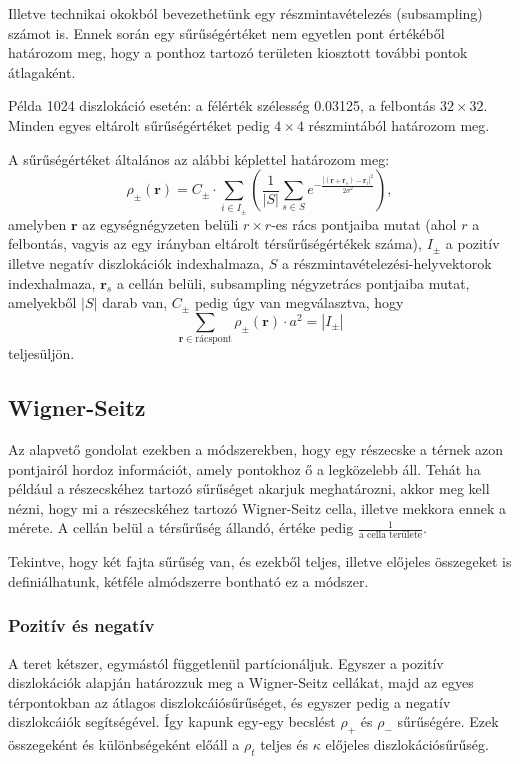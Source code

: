 \documentclass[10pt,a4paper]{scrartcl}
\let\mathbf\bm
\begin{document}
Illetve technikai okokból bevezethetünk egy részmintavételezés (subsampling) számot is. Ennek során egy sűrűségértéket nem egyetlen pont értékéből határozom meg, hogy a ponthoz tartozó területen kiosztott további pontok átlagaként.

Példa 1024 diszlokáció esetén: a félérték szélesség 0.03125, a felbontás $32\times 32$. Minden egyes eltárolt sűrűségértéket pedig $4\times 4$ részmintából határozom meg.

A sűrűségértéket általános az alábbi képlettel határozom meg:
\[{\rho _ \pm }\left( {\mathbf{r}} \right) = {C_ \pm } \cdot \sum\limits_{i \in {I_ \pm }} {\left( {\frac{1}{{\left| S \right|}}\sum\limits_{s \in S} {{e^{ - \frac{{{{\left| {\left( {{\mathbf{r}} + {{\mathbf{r}}_s}} \right) - {{\mathbf{r}}_i}} \right|}^2}}}{{2{\sigma ^2}}}}}} } \right)} ,\]
amelyben ${\mathbf{r}}$ az egységnégyzeten belüli $r\times r$-es rács pontjaiba mutat (ahol $r$ a felbontás, vagyis az egy irányban eltárolt térsűrűségértékek száma), $I_\pm$ a pozitív illetve negatív diszlokációk indexhalmaza, $S$ a részmintavételezési-helyvektorok indexhalmaza, ${{\mathbf{r}}_s}$ a cellán belüli, subsampling négyzetrács pontjaiba mutat, amelyekből ${\left| S \right|}$ darab van, ${C_ \pm }$ pedig úgy van megválasztva, hogy \[\sum\limits_{{\mathbf{r}} \in {\text{rácspont}}} {{\rho _ \pm }\left( {\mathbf{r}} \right) \cdot {a^2}}  = \left| {{I_ \pm }} \right|\]
teljesüljön.

\subsection{Wigner-Seitz}
Az alapvető gondolat ezekben a módszerekben, hogy egy részecske a térnek azon pontjairól hordoz információt, amely pontokhoz ő a legközelebb áll. Tehát ha például a részecskéhez tartozó sűrűséget akarjuk meghatározni, akkor meg kell nézni, hogy mi a részecskéhez tartozó Wigner-Seitz cella, illetve mekkora ennek a mérete. A cellán belül a térsűrűség állandó, értéke pedig $\frac{1}{\text{a cella területe}}$.

Tekintve, hogy két fajta sűrűség van, és ezekből teljes, illetve előjeles összegeket is definiálhatunk, kétféle almódszerre bontható ez a módszer.

\subsubsection{Pozitív és negatív}
A teret kétszer, egymástól függetlenül partícionáljuk. Egyszer a pozitív diszlokációk alapján határozzuk meg a Wigner-Seitz cellákat, majd az egyes térpontokban az átlagos diszlokcáiósűrűséget, és egyszer pedig a negatív diszlokcáiók segítségével. Így kapunk egy-egy becslést $\rho_+$ és $\rho_-$ sűrűségére. Ezek összegeként és különbségeként előáll a $\rho_t$ teljes és $\kappa$ előjeles diszlokációsűrűség.
\end{document}
